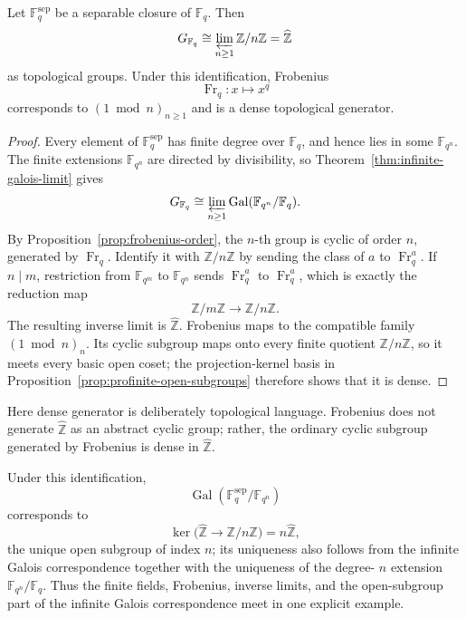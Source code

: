 \begin{theorem}
Let \(\mathbb F_q^{\mathrm{sep}}\) be a separable closure of \(\mathbb F_q\).
Then
\[
G_{\mathbb F_q}
\cong
\varprojlim_{n\geq1}\mathbb Z/n\mathbb Z
=\widehat{\mathbb Z}
\]
as topological groups.  Under this identification, Frobenius
\[
\operatorname{Fr}_q:x\longmapsto x^q
\]
corresponds to \((1\bmod n)_{n\geq1}\) and is a dense topological generator.
\end{theorem}
\begin{proof}
Every element of \(\mathbb F_q^{\mathrm{sep}}\) has finite degree over
\(\mathbb F_q\), and hence lies in some \(\mathbb F_{q^n}\).  The finite
extensions \(\mathbb F_{q^n}\) are directed by divisibility, so
Theorem~\ref{thm:infinite-galois-limit} gives
\[
G_{\mathbb F_q}
\cong
\varprojlim_{n\geq1}\operatorname{Gal}(\mathbb F_{q^n}/\mathbb F_q).
\]
By Proposition~\ref{prop:frobenius-order}, the \(n\)-th group is cyclic of
order \(n\), generated by \(\operatorname{Fr}_q\).  Identify it with
\(\mathbb Z/n\mathbb Z\) by sending the class of \(a\) to
\(\operatorname{Fr}_q^a\).  If \(n\mid m\), restriction from
\(\mathbb F_{q^m}\) to \(\mathbb F_{q^n}\) sends
\(\operatorname{Fr}_q^a\) to \(\operatorname{Fr}_q^a\), which is exactly
the reduction map
\[
\mathbb Z/m\mathbb Z\longrightarrow\mathbb Z/n\mathbb Z.
\]
The resulting inverse limit is \(\widehat{\mathbb Z}\).  Frobenius maps to
the compatible family \((1\bmod n)_n\).  Its cyclic subgroup maps onto every
finite quotient \(\mathbb Z/n\mathbb Z\), so it meets every basic open coset;
the projection-kernel basis in Proposition~\ref{prop:profinite-open-subgroups}
therefore shows that it is dense.
\end{proof}

Here dense generator is deliberately topological language.  Frobenius does
not generate \(\widehat{\mathbb Z}\) as an abstract cyclic group; rather, the
ordinary cyclic subgroup generated by Frobenius is dense in
\(\widehat{\mathbb Z}\).

Under this identification,
\[
\operatorname{Gal}(\mathbb F_q^{\mathrm{sep}}/\mathbb F_{q^n})
\]
corresponds to
\[
\ker\bigl(\widehat{\mathbb Z}\longrightarrow\mathbb Z/n\mathbb Z\bigr)
=n\widehat{\mathbb Z},
\]
the unique open subgroup of index \(n\); its uniqueness also follows from the
infinite Galois correspondence together with the uniqueness of the degree-
\(n\) extension \(\mathbb F_{q^n}/\mathbb F_q\).  Thus the finite fields,
Frobenius, inverse limits, and the open-subgroup part of the infinite Galois
correspondence meet in one explicit example.

